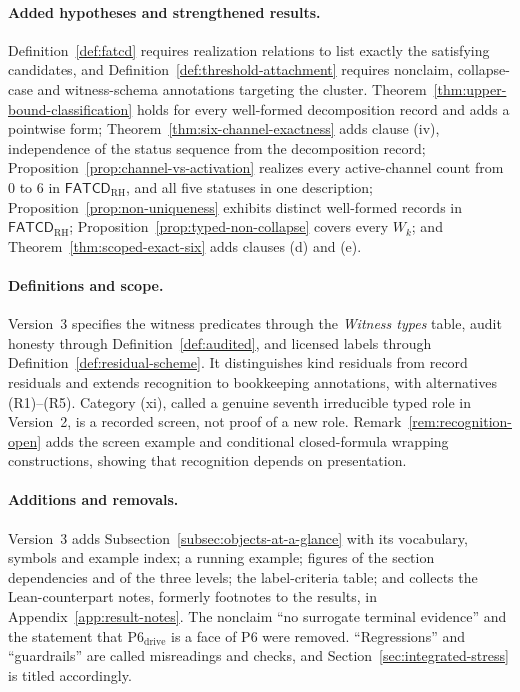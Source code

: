 \documentclass[11pt]{article}
\theoremstyle{definition}
\newcommand{\FATCD}{\ensuremath{\mathsf{FATCD}}}
\newcommand{\Psix}{\ensuremath{\mathrm{P6}}}
\begin{document}
\paragraph{Added hypotheses and strengthened results.}
Definition~\ref{def:fatcd} requires realization relations to list exactly the
satisfying candidates, and Definition~\ref{def:threshold-attachment} requires
nonclaim, collapse-case and witness-schema annotations targeting the cluster.
Theorem~\ref{thm:upper-bound-classification} holds for every well-formed
decomposition record and adds a pointwise form;
Theorem~\ref{thm:six-channel-exactness} adds clause (iv), independence of the
status sequence from the decomposition record;
Proposition~\ref{prop:channel-vs-activation} realizes every active-channel
count from \(0\) to \(6\) in \(\FATCD_{\mathrm{RH}}\), and all five
statuses in one description; Proposition~\ref{prop:non-uniqueness}
exhibits distinct well-formed records in \(\FATCD_{\mathrm{RH}}\); Proposition~\ref{prop:typed-non-collapse}
covers every \(W_k\); and Theorem~\ref{thm:scoped-exact-six} adds clauses (d)
and (e).

\paragraph{Definitions and scope.} Version~3 specifies the witness
predicates through the \emph{Witness types} table, audit honesty through
Definition~\ref{def:audited}, and licensed labels through
Definition~\ref{def:residual-scheme}. It distinguishes kind residuals
from record residuals and extends recognition to bookkeeping annotations,
with alternatives (R1)--(R5). Category (xi), called a genuine seventh
irreducible typed role in Version~2, is a recorded screen, not proof
of a new role. Remark~\ref{rem:recognition-open} adds the screen example
and conditional closed-formula wrapping constructions, showing that
recognition depends on presentation.

\paragraph{Additions and removals.} Version~3 adds Subsection~\ref{subsec:objects-at-a-glance}
with its vocabulary, symbols and example index; a running example; figures of
the section dependencies and of the three levels; the label-criteria table;
and collects the Lean-counterpart notes, formerly footnotes to the
results, in Appendix~\ref{app:result-notes}. The
nonclaim ``no surrogate terminal evidence'' and the statement that
\(\mathrm{P6}_{\mathrm{drive}}\) is a face of \(\Psix{}\) were removed.
``Regressions'' and ``guardrails'' are called misreadings and checks, and
Section~\ref{sec:integrated-stress} is titled accordingly.
\end{document}
